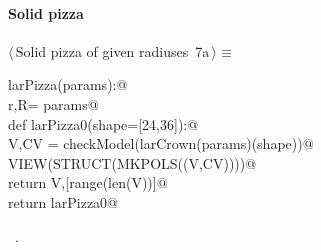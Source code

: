 \documentclass[11pt,oneside]{article}	%
\begin{document}
\paragraph{Solid pizza}
\begin{flushleft} \small \label{scrap15}
\protect{}$\langle\,$Solid pizza of given radiuses\nobreak\ {\footnotesize 7a}$\,\rangle\equiv$
\vspace{-1ex}
\begin{list}{}{} \item
\mbox{}\verb@def larPizza(params):@\\
\mbox{}\verb@   r,R= params@\\
\mbox{}\verb@   def larPizza0(shape=[24,36]):@\\
\mbox{}\verb@      V,CV = checkModel(larCrown(params)(shape))@\\
\mbox{}\verb@      VIEW(STRUCT(MKPOLS((V,CV))))@\\
\mbox{}\verb@      return V,[range(len(V))]@\\
\mbox{}\verb@   return larPizza0@\\
\mbox{}\verb@@{\NWsep}
\end{list}
\vspace{-1ex}
\footnotesize\addtolength{\baselineskip}{-1ex}
\begin{list}{}{\setlength{\itemsep}{-\parsep}\setlength{\itemindent}{-\leftmargin}}
\item \NWtxtMacroRefIn\ .
\end{list}
\end{flushleft}

\end{document}
